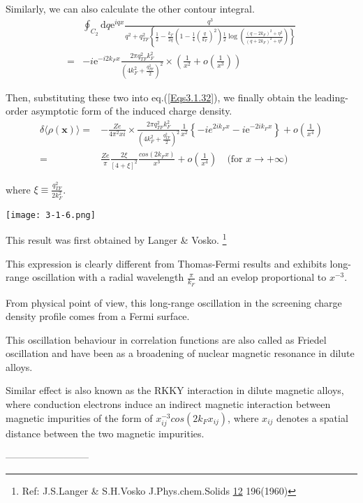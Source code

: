 \begin{itemize}
Similarly, we can also calculate the other contour integral.
\begin{equation} \label{Eqs3.1.35} \begin{split}
&\oint_{C_2} \mathrm{d} q \mathrm{e}^{i q x} \frac{q^3}{q^2 + q_{TF}^2 \left\{\frac{1}{2}-\frac{k_F}{2q}\left( 1-\frac{1}{4}(\frac{q}{k_F})^2 \right) \frac{1}{2} \log \left( \frac{(q-2 k_F)^2 + \eta^2}{(q + 2 k_F)^2 + \eta^2}\right) \right\}}\\
=& -i \mathrm{e}^{-i 2 k_F x} \frac{2\pi q_{TF}^2 k_F^2}{\left( 4 k_F^2 + \frac{q_{TF}^2}{2} \right)^2} \times \left( \frac{1}{x^2} + o(\frac{1}{x^3}) \right)
\end{split}\end{equation}

Then, substituting these two into eq.(\ref{Eqs3.1.32}), we finally obtain the leading-order asymptotic form of the induced charge density.
\begin{equation} \label{Eqs3.1.36} \begin{split}
\delta \langle \rho(\mathbf{x}) \rangle =& -\frac{Z e}{4\pi^2 x i} \times \frac{2\pi q_{TF}^2 k_F^2}{\left( 4 k_F^2 + \frac{q_{TF}^2}{2} \right)^2} \frac{1}{x^2} \left\{ -i e^{2i k_F x} -i \mathrm{e}^{-2i k_F x} \right\} + o(\frac{1}{x^4})\\
=& \frac{Z e}{\pi} \frac{2 \xi}{[4+\xi]^2} \frac{cos(2 k_F x)}{x^3} + o(\frac{1}{x^4})\quad\text{(for $x \rightarrow +\infty$)}
\end{split}\end{equation}

where $\xi \equiv \frac{q_{TF}^2}{2 k_F^2}$.
\begin{center} \label{Fig3.1.6}
\texttt{[image: 3-1-6.png]}
\end{center}

This result was first obtained by Langer \& Vosko.
\footnote{Ref: J.S.Langer \& S.H.Vosko J.Phys.chem.Solids \underline{12} 196(1960)}

This expression is clearly different from Thomas-Fermi results and exhibits long-range oscillation with a radial wavelength $\frac{\pi}{k_F}$ and an evelop proportional to $x^{-3}$.

From physical point of view, this long-range oscillation in the screening charge density profile comes from a Fermi surface.

This oscillation behaviour in correlation functions are also called as Friedel oscillation and have been as a broadening of nuclear magnetic resonance in dilute alloys.

Similar effect is also known as the RKKY interaction in dilute magnetic alloys, where conduction electrons induce an indirect magnetic interaction between magnetic impurities of the form of $x_{ij}^{-3} cos(2 k_F x_{ij})$, where $x_{ij}$ denotes a spatial distance between the two magnetic impurities.
\end{itemize}
\begin{center}--------------------------\end{center}

